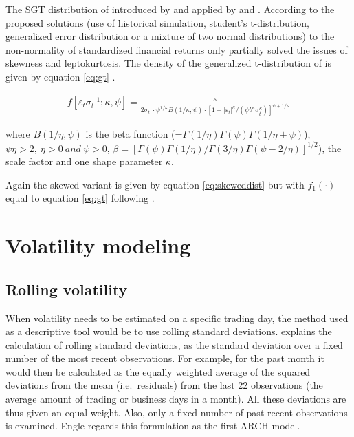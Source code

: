 \documentclass[a4paper, twoside]{templates/ociamthesis}
\begin{document}
\noindent The SGT distribution of introduced by \textcite{theodossiou1998} and applied by \textcite{bali2007} and \textcite{bali2008}. According to \textcite{bali2008} the proposed solutions (use of historical simulation, student's t-distribution, generalized error distribution or a mixture of two normal distributions) to the non-normality of standardized financial returns only partially solved the issues of skewness and leptokurtosis. The density of the generalized t-distribution of \textcite{mcdonald1988} is given by equation \eqref{eq:gt} \autocite{bollerslev1994}.

\begin{align}
f\left[\varepsilon_{t} \sigma_{t}^{-1} ; \kappa, \psi\right]=\frac{\kappa}{2 \sigma_{t} \ \cdot \psi^{1 / \kappa} B(1 / \kappa, \psi) \cdot\left[1+\left|\varepsilon_{t}\right|^{\kappa} /\left(\psi b^{\kappa} \sigma_{t}^{\kappa}\right)\right]^{\psi+1 / \kappa}}
 \label{eq:gt}
\end{align}

\noindent where \(B(1 / \eta, \psi)\) is the beta function (=\(\Gamma(1 / \eta) \Gamma(\psi) \Gamma(1 / \eta+\psi)\)), \(\psi\eta>2,\ \eta>0 \ and \ \psi >0\), \(\beta = [\Gamma(\psi)\Gamma(1 / \eta)/\Gamma(3 / \eta)\Gamma(\psi - 2/\eta)]^{1/2}\)), the scale factor and one shape parameter \(\kappa\).

\noindent Again the skewed variant is given by equation \eqref{eq:skeweddist} but with \(f_1(\cdot)\) equal to equation \eqref{eq:gt} following \textcite{trottier2015}.

\newpage

\hypertarget{vol-mod}{%
\section{Volatility modeling}\label{vol-mod}}

\hypertarget{rolling-volatility}{%
\subsection{Rolling volatility}\label{rolling-volatility}}

\noindent When volatility needs to be estimated on a specific trading day, the method used as a descriptive tool would be to use rolling standard deviations. \textcite{engle2001} explains the calculation of rolling standard deviations, as the standard deviation over a fixed number of the most recent observations. For example, for the past month it would then be calculated as the equally weighted average of the squared deviations from the mean (i.e.~residuals) from the last 22 observations (the average amount of trading or business days in a month). All these deviations are thus given an equal weight. Also, only a fixed number of past recent observations is examined. Engle regards this formulation as the first ARCH model.
\end{document}
